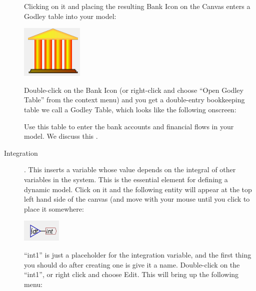 \begin{description}
Clicking on it and placing the resulting Bank Icon on the Canvas enters
a Godley table into your model:
\begin{center}
\includegraphics{images/NewItem29} 
\par\end{center}

Double-click on the Bank Icon (or right-click and choose ``Open Godley
Table'' from the context menu) and you get a double-entry bookkeeping
table we call a Godley Table, which looks like the following onscreen:


\begin{center}
\par\end{center}

Use this table to enter the bank accounts and financial flows in your
model. We discuss this .
\item [{Integration}] .\label{Integrate} This inserts
a variable whose value depends on the integral of other variables
in the system. This is the essential element for defining a dynamic
model. Click on it and the following entity will appear at the top
left hand side of the canvas (and move with your mouse until you click
to place it somewhere:
\begin{center}
\includegraphics{images/NewItem39} 
\par\end{center}

``int1'' is just a placeholder for the integration variable, and
the first thing you should do after creating one is give it a name.
Double-click on the ``int1'', or right click and choose Edit. This
will bring up the following menu:
\begin{center}
\par\end{center}


\end{description}
